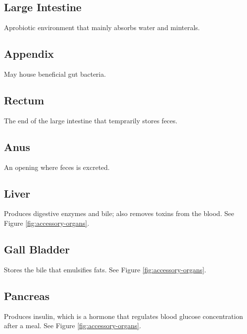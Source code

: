 \documentclass[12pt]{report}
\begin{document}
\subsection{Large Intestine}
\begin{definition}
    Aprobiotic environment that mainly absorbs water and minterals.
\end{definition}

\subsection{Appendix}
\begin{definition}[Appendix]
    May house beneficial gut bacteria.
\end{definition}

\subsection{Rectum}
\begin{definition}[Rectum]
    The end of the large intestine that temprarily stores feces.
\end{definition}

\subsection{Anus}
\begin{definition}[Anus]
    An opening where feces is excreted.
\end{definition}

\subsection{Liver}
\begin{definition}[Liver]
    Produces digestive enzymes and bile; also removes toxins from the blood. See Figure \ref{fig:accessory-organs}.

\end{definition}

\subsection{Gall Bladder}
\begin{definition}
    Stores the bile that emulsifies fats. See Figure \ref{fig:accessory-organs}.
\end{definition}

\subsection{Pancreas}
\begin{definition}[Pancreas]
    Produces insulin, which is a hormone that regulates blood glucose concentration after a meal. See Figure \ref{fig:accessory-organs}.
\end{definition}
\end{document}
